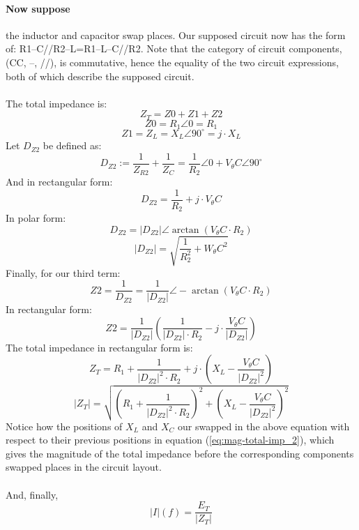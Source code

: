 \documentclass{article}
\begin{document}
	\paragraph[Swap]{Now suppose } the inductor and capacitor swap places.  Our 
	supposed circuit now has the form of: R1--C//R2--L=R1--L--C//R2.  Note that 
	the category of circuit components, (CC, --, //), is commutative, hence the 
	equality of the two circuit expressions, both of which describe the 
	supposed circuit.  \\ \\
	The total impedance is:
	$$ Z_T=Z0+Z1+Z2$$
	$$ Z0=R_1\angle0=R_1$$
	$$ Z1=Z_L=X_L\angle90^{\circ}=j \cdot X_L$$
	Let $D_{Z2}$ be defined as:
	$$ D_{Z2} := \frac{1}{Z_{R2}} + \frac{1}{Z_C} = \frac{1}{R_2}\angle0 + 
	V_\theta C \angle 90^{\circ}$$
	And in rectangular form:
	$$ D_{Z2}=\frac{1}{R_2} + j \cdot V_\theta C$$
	In polar form:
	$$ D_{Z2}=|D_{Z2}|\angle\arctan (V_\theta C \cdot R_2)$$
	$$ |D_{Z2}| = \sqrt{\frac{1}{R_2^2} + W_\theta C^2}$$
	Finally, for our third term:
	$$ Z2 = \frac{1}{D_{Z2}}= \frac{1}{|D_{Z2}|}\angle - \arctan (V_\theta C 
	\cdot R_2)$$
	In rectangular form:
	$$ Z2 = \frac{1}{|D_{Z2}|}\left( \frac{1}{|D_{Z2}| \cdot R_2} - j \cdot 
	\frac{V_\theta C}{|D_{Z2}|} \right)$$
	The total impedance in rectangular form is:
	$$ Z_T =  R_1 + \frac{1}{|D_{Z2}|^2 \cdot R_2} + j \cdot \left( X_L - 
	\frac{V_\theta C}{|D_{Z2}|^2} \right)$$
	\begin{equation}\label{eq:mag-total-imp_3}
		|Z_T| = \sqrt{\left( R_1 + \frac{1}{|D_{Z2}|^2 \cdot R_2} \right)^2 + 
		\left( X_L - \frac{V_\theta C}{|D_{Z2}|^2} \right)^2}
	\end{equation}
	Notice how the positions of $X_L$ and $X_C$ our swapped in the above 
	equation with respect to their previous positions in equation 
	(\ref{eq:mag-total-imp_2}), which gives the magnitude of the total 
	impedance before the corresponding components swapped places in the circuit 
	layout.\\ \\
	And, finally,
	$$ |I|(f) = \frac{E_T}{|Z_T|}$$
\end{document}
